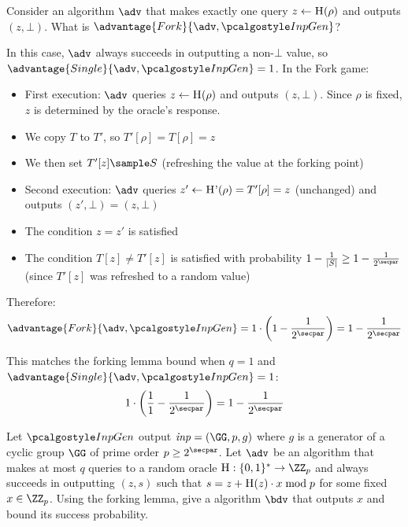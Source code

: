 \begin{exercise}
  Consider an algorithm $\adv$ that makes exactly one query $z \gets {\normalfont\textsc{H}}(\rho)$ and outputs $(z, \bot)$. What is $\advantage{Fork}{\adv, \algo{InpGen}}$?
\end{exercise}

\ifsolutions
\begin{mysolution}
  In this case, $\adv$ always succeeds in outputting a non-$\bot$ value, so $\advantage{Single}{\adv, \algo{InpGen}} = 1$. In the Fork game:
  
  \begin{itemize}
    \item First execution: $\adv$ queries $z \gets {\normalfont\textsc{H}}(\rho)$ and outputs $(z, \bot)$. Since $\rho$ is fixed, $z$ is determined by the oracle's response.
    \item We copy $T$ to $T'$, so $T'[\rho] = T[\rho] = z$
    \item We then set $T'[z] \sample S$ (refreshing the value at the forking point)
    \item Second execution: $\adv$ queries $z' \gets {\normalfont\textsc{H'}}(\rho) = T'[\rho] = z$ (unchanged) and outputs $(z', \bot) = (z, \bot)$
    \item The condition $z = z'$ is satisfied
    \item The condition $T[z] \neq T'[z]$ is satisfied with probability $1 - \frac{1}{|S|} \geq 1 - \frac{1}{2^\secpar}$ (since $T'[z]$ was refreshed to a random value)
  \end{itemize}
  
  Therefore:
  \[
  \advantage{Fork}{\adv, \algo{InpGen}} = 1 \cdot \left(1 - \frac{1}{2^\secpar}\right) = 1 - \frac{1}{2^\secpar}
  \]
  
  This matches the forking lemma bound when $q = 1$ and $\advantage{Single}{\adv, \algo{InpGen}} = 1$:
  \[
  1 \cdot \left(\frac{1}{1} - \frac{1}{2^\secpar}\right) = 1 - \frac{1}{2^\secpar}
  \]
\end{mysolution}
\fi


\begin{exercise}
  Let $\algo{InpGen}$ output $\mathit{inp} = (\GG,p,g)$ where $g$ is a generator of a cyclic group $\GG$ of prime order $p \geq 2^\secpar$.
  Let $\adv$ be an algorithm that makes at most $q$ queries to a random oracle $\pcoracle{H}: \{0,1\}^* \rightarrow \ZZ_p$ and always succeeds in outputting $(z, s)$ such that $s = z + {\normalfont\textsc{H}}(z) \cdot x \bmod p$ for some fixed $x \in \ZZ_p$.
  Using the forking lemma, give a \ppt algorithm $\bdv$ that outputs $x$ and bound its success probability.
\end{exercise}

